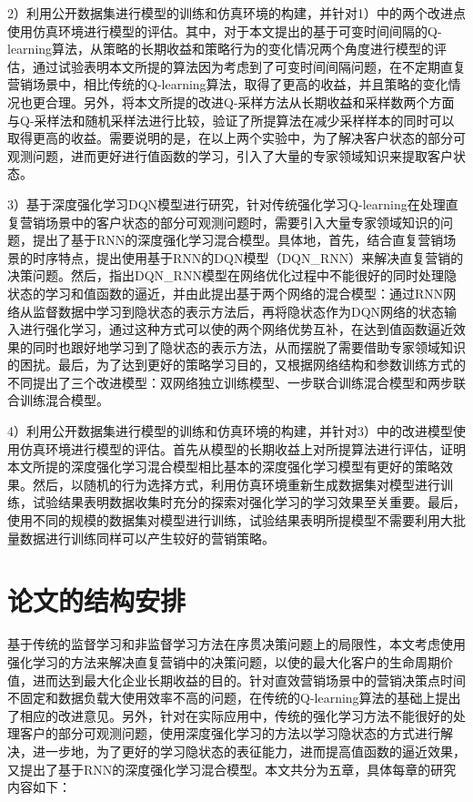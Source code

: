 2）利用公开数据集进行模型的训练和仿真环境的构建，并针对1）中的两个改进点使用仿真环境进行模型的评估。其中，对于本文提出的基于可变时间间隔的Q-learning算法，从策略的长期收益和策略行为的变化情况两个角度进行模型的评估，通过试验表明本文所提的算法因为考虑到了可变时间间隔问题，在不定期直复营销场景中，相比传统的Q-learning算法，取得了更高的收益，并且策略的变化情况也更合理。另外，将本文所提的改进Q-采样方法从长期收益和采样数两个方面与Q-采样法和随机采样法进行比较，验证了所提算法在减少采样样本的同时可以取得更高的收益。需要说明的是，在以上两个实验中，为了解决客户状态的部分可观测问题，进而更好进行值函数的学习，引入了大量的专家领域知识来提取客户状态。

3）基于深度强化学习DQN模型进行研究，针对传统强化学习Q-learning在处理直复营销场景中的客户状态的部分可观测问题时，需要引入大量专家领域知识的问题，提出了基于RNN的深度强化学习混合模型。具体地，首先，结合直复营销场景的时序特点，提出使用基于RNN的DQN模型（DQN_RNN）来解决直复营销的决策问题。然后，指出DQN_RNN模型在网络优化过程中不能很好的同时处理隐状态的学习和值函数的逼近，并由此提出基于两个网络的混合模型：通过RNN网络从监督数据中学习到隐状态的表示方法后，再将隐状态作为DQN网络的状态输入进行强化学习，通过这种方式可以使的两个网络优势互补，在达到值函数逼近效果的同时也跟好地学习到了隐状态的表示方法，从而摆脱了需要借助专家领域知识的困扰。最后，为了达到更好的策略学习目的，又根据网络结构和参数训练方式的不同提出了三个改进模型：双网络独立训练模型、一步联合训练混合模型和两步联合训练混合模型。

4）利用公开数据集进行模型的训练和仿真环境的构建，并针对3）中的改进模型使用仿真环境进行模型的评估。首先从模型的长期收益上对所提算法进行评估，证明本文所提的深度强化学习混合模型相比基本的深度强化学习模型有更好的策略效果。然后，以随机的行为选择方式，利用仿真环境重新生成数据集对模型进行训练，试验结果表明数据收集时充分的探索对强化学习的学习效果至关重要。最后，使用不同的规模的数据集对模型进行训练，试验结果表明所提模型不需要利用大批量数据进行训练同样可以产生较好的营销策略。

\section{论文的结构安排}
基于传统的监督学习和非监督学习方法在序贯决策问题上的局限性，本文考虑使用强化学习的方法来解决直复营销中的决策问题，以使的最大化客户的生命周期价值，进而达到最大化企业长期收益的目的。针对直效营销场景中的营销决策点时间不固定和数据负载大使用效率不高的问题，在传统的Q-learning算法的基础上提出了相应的改进意见。另外，针对在实际应用中，传统的强化学习方法不能很好的处理客户的部分可观测问题，使用深度强化学习的方法以学习隐状态的方式进行解决，进一步地，为了更好的学习隐状态的表征能力，进而提高值函数的逼近效果，又提出了基于RNN的深度强化学习混合模型。本文共分为五章，具体每章的研究内容如下：

